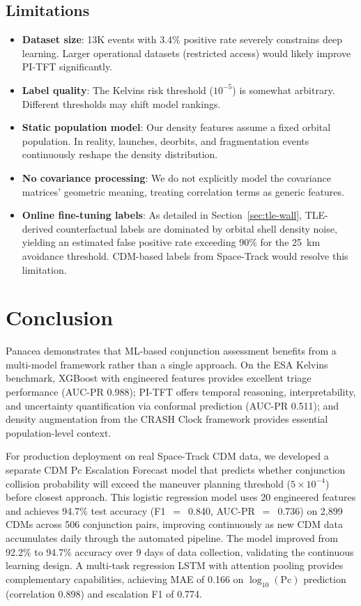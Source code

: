 \documentclass{article}
\begin{document}
\subsection{Limitations}
\label{sec:limitations-disc}

\begin{itemize}
\item \textbf{Dataset size}: 13K events with 3.4\% positive rate severely constrains deep learning. Larger operational datasets (restricted access) would likely improve PI-TFT significantly.
\item \textbf{Label quality}: The Kelvins risk threshold ($10^{-5}$) is somewhat arbitrary. Different thresholds may shift model rankings.
\item \textbf{Static population model}: Our density features assume a fixed orbital population. In reality, launches, deorbits, and fragmentation events continuously reshape the density distribution.
\item \textbf{No covariance processing}: We do not explicitly model the covariance matrices' geometric meaning, treating correlation terms as generic features.
\item \textbf{Online fine-tuning labels}: As detailed in Section~\ref{sec:tle-wall}, TLE-derived counterfactual labels are dominated by orbital shell density noise, yielding an estimated false positive rate exceeding 90\% for the 25~km avoidance threshold. CDM-based labels from Space-Track would resolve this limitation.
\end{itemize}

\section{Conclusion}
\label{sec:conclusion}

Panacea demonstrates that ML-based conjunction assessment benefits from a multi-model framework rather than a single approach. On the ESA Kelvins benchmark, XGBoost with engineered features provides excellent triage performance (AUC-PR 0.988); PI-TFT offers temporal reasoning, interpretability, and uncertainty quantification via conformal prediction (AUC-PR 0.511); and density augmentation from the CRASH Clock framework provides essential population-level context.

For production deployment on real Space-Track CDM data, we developed a separate CDM Pc Escalation Forecast model that predicts whether conjunction collision probability will exceed the maneuver planning threshold ($5 \times 10^{-4}$) before closest approach. This logistic regression model uses 20 engineered features and achieves 94.7\% test accuracy (F1~$=$~0.840, AUC-PR~$=$~0.736) on 2,899 CDMs across 506 conjunction pairs, improving continuously as new CDM data accumulates daily through the automated pipeline. The model improved from 92.2\% to 94.7\% accuracy over 9 days of data collection, validating the continuous learning design. A multi-task regression LSTM with attention pooling provides complementary capabilities, achieving MAE of 0.166 on $\log_{10}(\text{Pc})$ prediction (correlation 0.898) and escalation F1 of 0.774.
\end{document}
